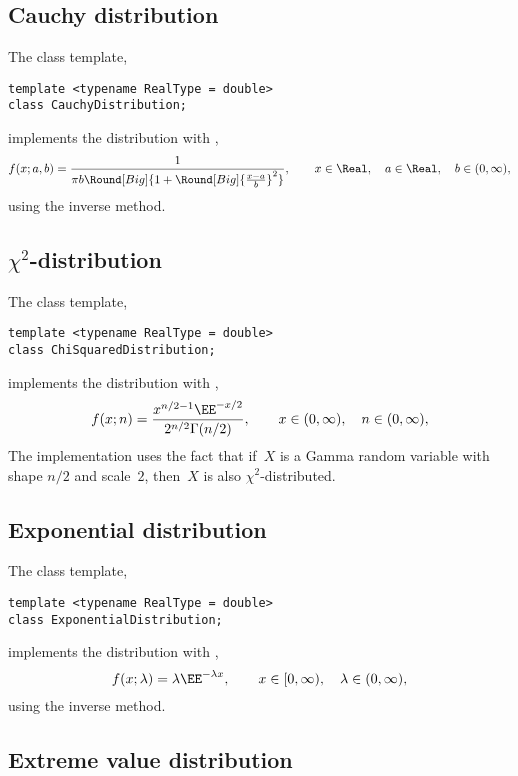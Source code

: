 \subsection{Cauchy distribution}
\label{sub:Cauchy distribution}

The class template,
\begin{verbatim}
template <typename RealType = double>
class CauchyDistribution;
\end{verbatim}
implements the distribution with \pdf,
\begin{equation*}
  f(x;a,b) =
  \frac{1}{\pi b\Round[Big]{1 + \Round[Big]{\frac{x - a}{b}}^2}},\qquad
  x \in \Real,\quad a \in \Real,\quad b \in (0,\infty),
\end{equation*}
using the inverse method.

\subsection{\texorpdfstring{$\chi^2$}{Chi-squared}-distribution}
\label{Chi-squared-distribution}

The class template,
\begin{verbatim}
template <typename RealType = double>
class ChiSquaredDistribution;
\end{verbatim}
implements the distribution with \pdf,
\begin{equation*}
  f(x;n) = \frac{x^{n/2 - 1}\EE^{-x/2}}{2^{n/2}\Gamma(n/2)},\qquad
  x \in (0,\infty),\quad n \in (0,\infty),
\end{equation*}
The implementation uses the fact that if~$X$ is a Gamma random variable with
shape $n / 2$ and scale~$2$, then~$X$ is also $\chi^2$-distributed.

\subsection{Exponential distribution}
\label{sub:Exponential distribution}

The class template,
\begin{verbatim}
template <typename RealType = double>
class ExponentialDistribution;
\end{verbatim}
implements the distribution with \pdf,
\begin{equation*}
  f(x;\lambda) = \lambda\EE^{-\lambda x},\qquad
  x \in [0,\infty),\quad \lambda \in (0,\infty),
\end{equation*}
using the inverse method.

\subsection{Extreme value distribution}
\label{sub:Extreme value distribution}

